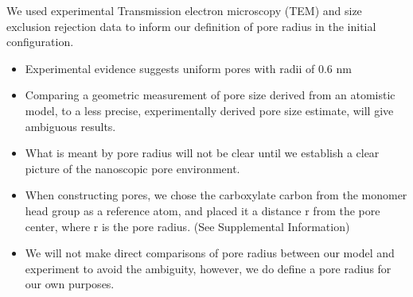 \documentclass{article}
\begin{document}
  We used experimental Transmission electron microscopy (TEM) and size exclusion rejection
  data \cite{feng_scalable_2014,feng_thin_2016,zhou_supported_2005} to inform our definition
  of pore radius in the initial configuration.
  \begin{itemize}
    \item Experimental evidence suggests uniform pores with radii of 0.6 nm 
    \item Comparing a geometric measurement of pore size derived from an atomistic model,
    to a less precise, experimentally derived pore size estimate, will give ambiguous results.
    \item What is meant by pore radius will not be clear until we establish a clear picture
    of the nanoscopic pore environment.
    \item When constructing pores, we chose the carboxylate carbon from the monomer
    head group as a reference atom, and placed it a distance r from the pore center,
    where r is the pore radius. (See Supplemental Information) %
    \item We will not make direct comparisons of pore radius between our model 
    and experiment to avoid the ambiguity, however, we do define a pore radius  
    for our own purposes.
  \end{itemize}
  
\end{document}
